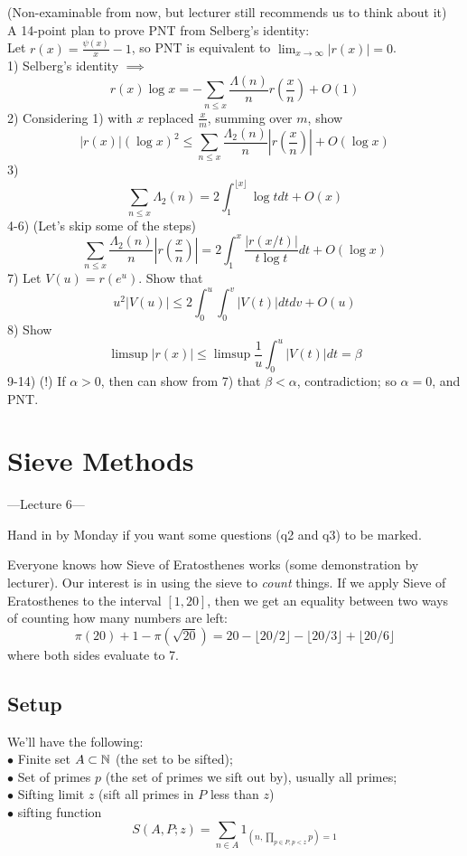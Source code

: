 \documentclass[a4paper]{article}
\begin{document}
(Non-examinable from now, but lecturer still recommends us to think about it)\\
A 14-point plan to prove PNT from Selberg's identity:\\
Let $r(x) = \frac{\psi(x)}{x} - 1$, so PNT is equivalent to $\lim_{x \to \infty} |r(x)| = 0$.\\
1) Selberg's identity $\implies$
\[
r(x) \log x = -\sum_{n \leq x} \frac{\Lambda(n)}{n} r(\frac{x}{n}) + O(1)
\]
2) Considering 1) with $x$ replaced $\frac{x}{m}$, summing over $m$, show 
\[
|r(x)|(\log x)^2 \leq \sum_{n \leq x} \frac{\Lambda_2(n)}{n} |r(\frac{x}{n})| + O(\log x)
\]
3) 
\[
\sum_{n \leq x} \Lambda_2(n) = 2\int_1^{\lfloor x \rfloor} \log t dt + O(x)
\]
4-6) (Let's skip some of the steps)
\[
\sum_{n \leq x} \frac{\Lambda_2(n)}{n} |r(\frac{x}{n})| = 2\int_1^x \frac{|r(x/t)|}{t\log t} dt + O(\log x)
\]
7) Let $V(u) = r(e^u)$. Show that 
\[
u^2 |V(u)| \leq 2 \int_0^u \int_0^v |V(t)| dt dv + O(u)
\]
8) Show
\[
\limsup|r(x)| \leq \limsup \frac{1}{u} \int_0^u |V(t)| dt = \beta
\]
9-14) (!) If $\alpha>0$, then can show from 7) that $\beta < \alpha$, contradiction; so $\alpha=0$, and PNT.

\newpage

\section{Sieve Methods}

---Lecture 6---

Hand in by Monday if you want some questions (q2 and q3) to be marked.

Everyone knows how Sieve of Eratosthenes works (some demonstration by lecturer). Our interest is in using the sieve to \emph{count} things. If we apply Sieve of Eratosthenes to the interval $[1,20]$, then we get an equality between two ways of counting how many numbers are left:
\[
\pi(20)+1-\pi(\sqrt{20}) = 20-\lfloor 20/2\rfloor - \lfloor 20/3\rfloor + \lfloor 20/6\rfloor
\]
where both sides evaluate to 7.

\subsection{Setup}
We'll have the following:\\
$\bullet$ Finite set $A \subset \mathbb{N}$ (the set to be sifted);\\
$\bullet$ Set of primes $p$ (the set of primes we sift out by), usually all primes;\\
$\bullet$ Sifting limit $z$ (sift all primes in $P$ less than $z$)\\
$\bullet$ sifting function
\[
S(A,P;z) = \sum_{n \in A} 1_{(n,\prod_{p \in P, p < z}p) =1}
\]
\end{document}
